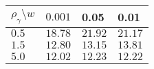 
\begin{tabular}{|p{0.6in}|p{1.2in}|p{1.2in}|p{1.2in}|} \hline
$\rho_{\gamma}\setminus w$ & $0.001 $ & 0.05 & 0.01 \\ \hline
$0.5$ & $18.78$ & $21.92$ & $21.17$  \\ \hline
$1.5$ & $12.80$ & $13.15$ & $13.81$  \\ \hline
$5.0$ & $12.02$ & $12.23$ & $12.22$  \\ \hline
\end{tabular}\\[20pt]
